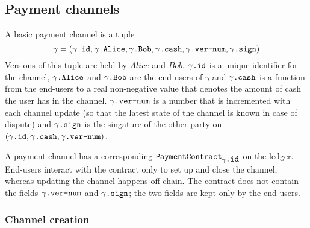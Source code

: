 \subsection{Payment channels}
  A basic payment channel is a tuple
  \begin{equation*}
    \gamma = \left(\gamma\mbox{\texttt{.id}}, \gamma\mbox{\texttt{.Alice}},
    \gamma\mbox{\texttt{.Bob}}, \gamma\mbox{\texttt{.cash}},
    \gamma\mbox{\texttt{.ver-num}}, \gamma\mbox{\texttt{.sign}}\right)
  \end{equation*}
  Versions of this tuple are held by $Alice$ and $Bob$. $\gamma\mbox{\texttt{.id}}$ is a
  unique identifier for the channel, $\gamma\mbox{\texttt{.Alice}}$ and
  $\gamma\mbox{\texttt{.Bob}}$ are the end-users of $\gamma$ and
  $\gamma\mbox{\texttt{.cash}}$ is a function from the end-users to a real non-negative
  value that denotes the amount of cash the user has in the channel.
  $\gamma\mbox{\texttt{.ver-num}}$ is a number that is incremented with each channel
  update (so that the latest state of the channel is known in case of dispute) and
  $\gamma\mbox{\texttt{.sign}}$ is the singature of the other party on
  $\left(\gamma\mbox{\texttt{.id}}, \gamma\mbox{\texttt{.cash}},
  \gamma\mbox{\texttt{.ver-num}}\right)$.

  A payment channel has a corresponding
  $\mbox{\texttt{PaymentContract}}_{\gamma\mbox{\texttt{.id}}}$ on the ledger. End-users
  interact with the contract only to set up and close the channel, whereas updating the
  channel happens off-chain. The contract does not contain the fields
  $\gamma\mbox{\texttt{.ver-num}}$ and $\gamma\mbox{\texttt{.sign}}$; the two fields are
  kept only by the end-users.

  \subsubsection{Channel creation} \ \\

